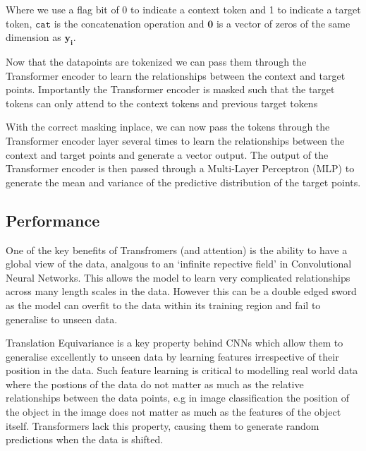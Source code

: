 \documentclass[../../main.tex]{subfiles}
\begin{document}
Where we use a flag bit of 0 to indicate a context token and 1 to indicate a target token, $\texttt{cat}$ is the concatenation operation and $\bm{0}$ is a vector of zeros of the same dimension as $\bm{y_i}$.

Now that the datapoints are tokenized we can pass them through the Transformer encoder to learn the relationships between the context and target points. Importantly the Transformer encoder is masked such that the target tokens can only attend to the context tokens and previous target tokens


With the correct masking inplace, we can now pass the tokens through the Transformer encoder layer several times to learn the relationships between the context and target points and generate a vector output. The output of the Transformer encoder is then passed through a Multi-Layer Perceptron (MLP) to generate the mean and variance of the predictive distribution of the target points. 


\subsection{Performance}

One of the key benefits of Transfromers (and attention) is the ability to have a global view of the data, analgous to an `infinite repective field' in Convolutional Neural Networks. This allows the model to learn very complicated relationships across many length scales in the data. However this can be a double edged sword as the model can overfit to the data within its training region and fail to generalise to unseen data. 

Translation Equivariance is a key property behind CNNs which allow them to generalise excellently to unseen data by learning features irrespective of their position in the data. Such feature learning is critical to modelling real world data where the postions of the data do not matter as much as the relative relationships between the data points, e.g in image classification the position of the object in the image does not matter as much as the features of the object itself. Transformers lack this property, causing them to generate random predictions when the data is shifted. 

\end{document}
